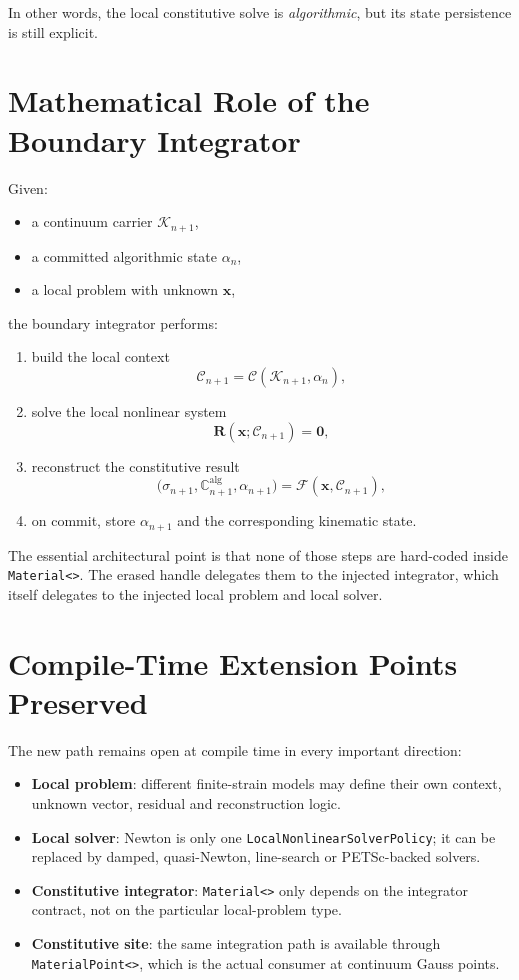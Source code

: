 In other words, the local constitutive solve is \emph{algorithmic}, but its
state persistence is still explicit.

\section{Mathematical Role of the Boundary Integrator}

Given:
\begin{itemize}
  \item a continuum carrier $\mathcal{K}_{n+1}$,
  \item a committed algorithmic state $\alpha_n$,
  \item a local problem with unknown $\mathbf{x}$,
\end{itemize}
the boundary integrator performs:
\begin{enumerate}
  \item build the local context
        \[
          \mathcal{C}_{n+1}
          =
          \mathcal{C}(\mathcal{K}_{n+1}, \alpha_n),
        \]
  \item solve the local nonlinear system
        \[
          \mathbf{R}(\mathbf{x}; \mathcal{C}_{n+1}) = \mathbf{0},
        \]
  \item reconstruct the constitutive result
        \[
          \bigl(
            \sigma_{n+1},
            \mathbb{C}_{n+1}^{\text{alg}},
            \alpha_{n+1}
          \bigr)
          =
          \mathcal{F}(\mathbf{x}, \mathcal{C}_{n+1}),
        \]
  \item on commit, store $\alpha_{n+1}$ and the corresponding kinematic state.
\end{enumerate}

The essential architectural point is that none of those steps are hard-coded
inside \texttt{Material<>}. The erased handle delegates them to the injected
integrator, which itself delegates to the injected local problem and local
solver.

\section{Compile-Time Extension Points Preserved}

The new path remains open at compile time in every important direction:
\begin{itemize}
  \item \textbf{Local problem}: different finite-strain models may define
        their own context, unknown vector, residual and reconstruction logic.
  \item \textbf{Local solver}: Newton is only one
        \texttt{LocalNonlinearSolverPolicy}; it can be replaced by damped,
        quasi-Newton, line-search or PETSc-backed solvers.
  \item \textbf{Constitutive integrator}: \texttt{Material<>} only depends on
        the integrator contract, not on the particular local-problem type.
  \item \textbf{Constitutive site}: the same integration path is available
        through \texttt{MaterialPoint<>}, which is the actual consumer at
        continuum Gauss points.
\end{itemize}

